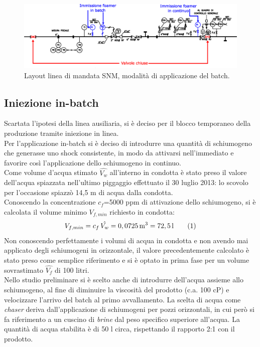 \begin{figure}[htbp] %
    \centering
    \includegraphics[width=\textwidth]{fig/test/mandata.eps}
    \caption{Layout linea di mandata SNM, modalità di applicazione del batch.} 
    \label{fig:mandata}
\end{figure}

\subsection{Iniezione in-batch}
Scartata l'ipotesi della linea ausiliaria, si è deciso per il blocco temporaneo della produzione tramite iniezione in linea.\\
Per l'applicazione in-batch si è deciso di introdurre una quantità di schiumogeno che generasse uno shock consistente, in modo da attivarsi nell'immediato e favorire così l'applicazione dello schiumogeno in continuo.\\
Come volume d'acqua stimato \(\hat{V_{w}}\) all'interno in condotta è stato preso il valore dell'acqua spiazzata nell'ultimo piggaggio effettuato il 30 luglio 2013: lo scovolo per l'occasione spiazzò 14,5 m di acqua dalla condotta.\\
Conoscendo la concentrazione \(c_f\)=5000 ppm di attivazione dello schiumogeno, si è calcolata il volume minimo \(V_{f,min}\) richiesto in condotta:
\[V_{f,min}= c_f\,\hat{V_w}=0,0725 \, \mathrm{m^3}=72,5 \, \mathrm{l} \label{eq:volfoamer}\addtag \]
Non conoscendo perfettamente i volumi di acqua in condotta e non avendo mai applicato degli schiumogeni in orizzontale, il valore precedentemente calcolato è stato preso come semplice riferimento e si è optato in prima fase per un volume sovrastimato \(\hat{V_{f}}\) di 100 litri.\\
Nello studio preliminare si è scelto anche di introdurre dell'acqua assieme allo schiumogeno, al fine di diminuire la viscosità del prodotto (c.a. 100 cP) e velocizzare l'arrivo del batch al primo avvallamento. La scelta di acqua come \textit{chaser} deriva dall'applicazione di schiumogeni per pozzi orizzontali, in cui però si fa riferimento a un cuscino di \textit{brine} dal peso specifico superiore all'acqua. La quantità di acqua stabilita è di 50 l circa, rispettando il rapporto 2:1 con il prodotto.\\

